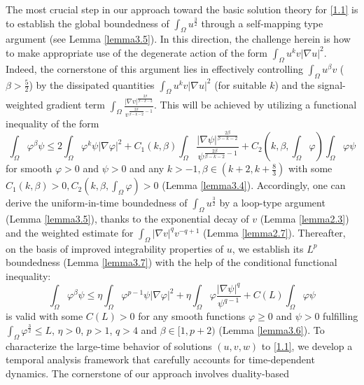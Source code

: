 \documentclass[12pt]{article}
\theoremstyle{plain}
\theoremstyle{definition}
\numberwithin{equation}{section}
\begin{document}
The most crucial  step in our approach toward the basic solution theory for   \eqref{1.1} is to establish the global boundedness of
$\int_\Omega u^{\frac3 2}$ through a self-mapping type argument (see Lemma \ref{lemma3.5}).  In this direction, the challenge herein is  how to make appropriate use of the degenerate  action   of  the form $\int_{\Omega}u^{k}v|\nabla u|^2$. Indeed,
the cornerstone of this argument
 lies in effectively controlling
  $\int_{\Omega} u^{\beta} v$  ($\beta>\frac 52$) %
by the dissipated quantities   $\int_{\Omega}u^{k}v|\nabla u|^2$ (for suitable $k$)
and  the signal-weighted gradient term $\int_\Omega\frac{|\nabla v|^{\frac{2\beta}{\beta-k-2}}}{v^{\frac{2\beta}{\beta-k-2}-1}}$.
This  will be achieved   by utilizing  %
a functional inequality of the form
$$\int_{\Omega}\varphi^{\beta}\psi\leq  2\int_{\Omega}\varphi^{k}\psi|\nabla \varphi|^2+C_1(k, \beta)\int_\Omega\frac{|\nabla \psi|^{\frac{2\beta}{\beta-k-2}}}{\psi^{\frac{2\beta}{\beta-k-2}-1}}+C_2(k, \beta, \int_\Omega \varphi)\int_{\Omega}\varphi \psi$$
 for smooth $\varphi> 0$ and $\psi>0$ and any $k>-1, \beta\in (k+2,k+\frac8 3)$ with some $C_1(k, \beta)>0, C_2(k, \beta, \int_\Omega \varphi)>0$ (Lemma \ref{lemma3.4}).  Accordingly, one can derive the uniform-in-time boundedness of $\int_\Omega u^{\frac3 2}$ by a loop-type argument (Lemma \ref{lemma3.5}), thanks to  the exponential decay of $v$
 (Lemma \ref{lemma2.3}) and the weighted estimate for $\int_\Omega |\nabla v|^q v^{-q+1}$ (Lemma \ref{lemma2.7}). Thereafter, on the basis  of improved integrability properties of $u$, we establish its $L^p$ boundedness (Lemma \ref{lemma3.7})  with the help of
the conditional functional  inequality:
  $$\int_{\Omega}\varphi^{\beta} \psi\leq \eta \int_{\Omega}\varphi^{p-1}\psi|\nabla
    \varphi|^2+\eta \int_{\Omega}\varphi\frac{|\nabla  \psi|^q}{{\psi}^{q-1}}+C(L)\int_{\Omega}\varphi \psi$$
  is valid with some $C(L)>0$ for any smooth functions $\varphi\geq  0$ and $\psi>0$ fulfilling
   $\int_{\Omega}\varphi^{\frac{3}{2}}\leq L$, $\eta>0$,
$p>1$, $q>4$ and $\beta\in [1,p+2)$ (Lemma \ref{lemma3.6}).
  To characterize the large-time behavior of solutions $(u,v,w)$ to \eqref{1.1}, we develop a temporal analysis framework that carefully accounts for time-dependent dynamics. The cornerstone of our approach involves duality-based
\end{document}
